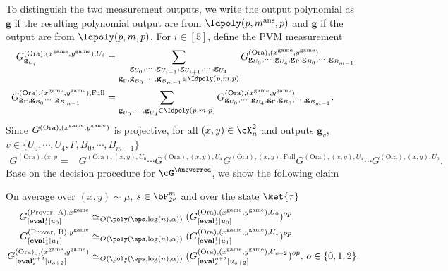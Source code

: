 To distinguish the two measurement outputs, we write the output polynomial as $\overline{\textbf{g}}$ if the resulting polynomial output are from $\Idpoly(p,m^{\text{ans}},p)$ and $\textbf{g}$ if the output are from $\Idpoly(p,m,p)$. For $i \in [5]$, define the PVM measurement
\begin{align}
	\label{eq:ARproofOracFull-1} G_{\textbf{g}_{U_i}}^{(\text{Ora}), (x^{\game}, y^{\game}), U_i} &= \sum_{\substack{\textbf{g}_{U_0}, \cdots,\textbf{g}_{U_{i-1}},\textbf{g}_{U_{i+1}}, \cdots,\textbf{g}_{U_4} \\ \textbf{g}_{\Gamma}, \textbf{g}_{B_0},\cdots,  \textbf{g}_{B_{m-1}} \in \Idpoly(p, m, p) } }  G_{\textbf{g}_{U_0}, \cdots,\textbf{g}_{U_4},  \textbf{g}_{\Gamma}, \textbf{g}_{B_0},\cdots,  \textbf{g}_{B_{m-1}}  }^{(\text{Ora}), (x^{\game}, y^{\game})} \\
	\label{eq:ARproofOracFull-2} G_{\textbf{g}_{\Gamma}, \textbf{g}_{B_0} \cdots,\textbf{g}_{B_{m-1}}}^{(\text{Ora}), (x^{\game}, y^{\game}), \text{Full}} &= \sum_{\textbf{g}_{U_0}, \cdots, \textbf{g}_{U_4}  \in \Idpoly(p, m, p) }  G_{\textbf{g}_{U_0}, \cdots,\textbf{g}_{U_4},  \textbf{g}_{\Gamma}, \textbf{g}_{B_0},\cdots,  \textbf{g}_{B_{m-1}}  }^{(\text{Ora}), (x^{\game}, y^{\game})}.
\end{align}
Since $ G^{(\text{Ora}), (x^{\text{game}}, y^{\text{game}})} $ is projective, for all $(x,y) \in \cX_n^2$ and outputs $\textbf{g}_v$, $v \in \{U_0, \cdots, U_4, \Gamma, B_0, \cdots, B_{m-1}\}$
\begin{align} \label{eq:ARproofGOrafull}
	 G^{(\text{Ora}), (x, y} = &G^{(\text{Ora}), (x, y),U_0 } \cdots  G^{(\text{Ora}), (x, y), U_4} G^{(\text{Ora}), (x, y), \text{Full}} G^{(\text{Ora}), (x, y),U_4 } \cdots G^{(\text{Ora}), (x, y), U_0}.
\end{align}
Base on the decision procedure for $\cG^{\Answerred}$, we show the following claim 
\begin{claim} \label{claim:ARconsistpoly}
	On average over $(x,y) \sim \mu$, $s \in \bF_{2^p}^m$ and over the state $\ket{\tau}$
	\begin{align}
		\label{eq:ARconsistAlicepoly} G_{[\textbf{eval}_{s}^1 | u_0]}^{(\text{Prover, A}), x^{\game}}	&\simeq_{O(\poly(\eps, \log(n), \alpha))} 	(G_{[\textbf{eval}_{s}^1 | u_0]}^{(\text{Ora}), (x^{\game}, y^{\game}), U_0})^{op}  \\
		\label{eq:ARconsistBobpoly} G_{[\textbf{eval}_{s}^1 | u_1]}^{(\text{Prover, B}), y^{\game}}	&\simeq_{O(\poly(\eps, \log(n), \alpha))} 	(G_{[\textbf{eval}_{s}^1 | u_1]}^{(\text{Ora}), (x^{\game}, y^{\game}), U_1})^{op}  \\
		\label{eq:ARconsistOracpoly} G_{[\textbf{eval}_{s}^{o+2} | u_{o+2}]}^{(\text{Ora})_{o}, (x^{\game}, y^{\game})}	&\simeq_{O(\poly(\eps, \log(n), \alpha))} 	(	G_{[\textbf{eval}_{s}^{o+2} | u_{o+2}]}^{(\text{Ora}), (x^{\game}, y^{\game}), U_{o+2}})^{op} , \, o \in \{0,1,2\}.
	\end{align} 
\end{claim}

